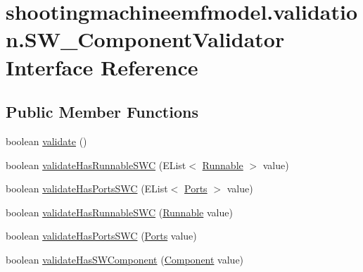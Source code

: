 \hypertarget{interfaceshootingmachineemfmodel_1_1validation_1_1_s_w___component_validator}{\section{shootingmachineemfmodel.\-validation.\-S\-W\-\_\-\-Component\-Validator Interface Reference}
\label{interfaceshootingmachineemfmodel_1_1validation_1_1_s_w___component_validator}
}
\subsection*{Public Member Functions}
\begin{DoxyCompactItemize}
\item 
boolean \hyperlink{interfaceshootingmachineemfmodel_1_1validation_1_1_s_w___component_validator_a2d0a51657d33dcab117ea23ccf64f3c4}{validate} ()
\item 
boolean \hyperlink{interfaceshootingmachineemfmodel_1_1validation_1_1_s_w___component_validator_a0a2e84c3e02ca48f370b049b0e278dc0}{validate\-Has\-Runnable\-S\-W\-C} (E\-List$<$ \hyperlink{interfaceshootingmachineemfmodel_1_1_runnable}{Runnable} $>$ value)
\item 
boolean \hyperlink{interfaceshootingmachineemfmodel_1_1validation_1_1_s_w___component_validator_a262a2477c3224a04e1180eb68fa4c8cf}{validate\-Has\-Ports\-S\-W\-C} (E\-List$<$ \hyperlink{interfaceshootingmachineemfmodel_1_1_ports}{Ports} $>$ value)
\item 
boolean \hyperlink{interfaceshootingmachineemfmodel_1_1validation_1_1_s_w___component_validator_afd5881d3bb86ccccfcc2efc72d791f7c}{validate\-Has\-Runnable\-S\-W\-C} (\hyperlink{interfaceshootingmachineemfmodel_1_1_runnable}{Runnable} value)
\item 
boolean \hyperlink{interfaceshootingmachineemfmodel_1_1validation_1_1_s_w___component_validator_aa9ffcd9c63d404fb70433283257d5698}{validate\-Has\-Ports\-S\-W\-C} (\hyperlink{interfaceshootingmachineemfmodel_1_1_ports}{Ports} value)
\item 
boolean \hyperlink{interfaceshootingmachineemfmodel_1_1validation_1_1_s_w___component_validator_a58e07d973ac6cf2fa616132955275985}{validate\-Has\-S\-W\-Component} (\hyperlink{interfaceshootingmachineemfmodel_1_1_component}{Component} value)
\end{DoxyCompactItemize}


